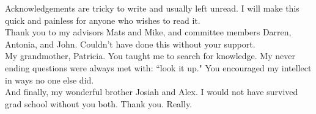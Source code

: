 Acknowledgements are tricky to write and usually left unread. I will make this quick and painless for anyone who wishes to read it. \\

Thank you to my advisors Mats and Mike, and committee members Darren, Antonia, and John. Couldn't have done this without your support. \\

My grandmother, Patricia. You taught me to search for knowledge.  My never ending questions were always met with: ``look it up." You encouraged my intellect in ways no one else did.\\

And finally, my wonderful brother Josiah and Alex. I would not have survived grad school without you both. Thank you. Really. 

